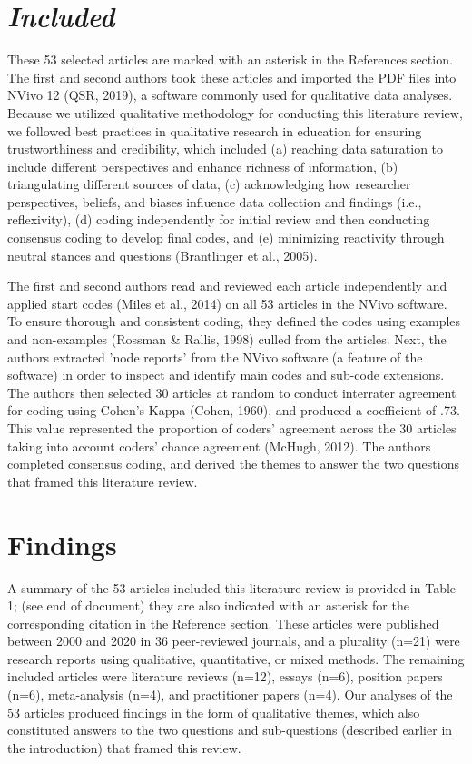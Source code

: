 \documentclass[11pt]{sig-alternate}
\begin{document}
\begin{large}
\section*{\textit{Included}}

These 53 selected articles are marked with an asterisk in the References section. The first and second authors took these articles and imported the PDF files into NVivo 12 (QSR, 2019), a software commonly used for qualitative data analyses. Because we utilized qualitative methodology for conducting this literature review, we followed best practices in qualitative research in education for ensuring trustworthiness and credibility, which included (a) reaching data saturation to include different perspectives and enhance richness of information, (b) triangulating different sources of data, (c) acknowledging how researcher perspectives, beliefs, and biases influence data collection and findings (i.e., reflexivity), (d) coding independently for initial review and then conducting consensus coding to develop final codes, and (e) minimizing reactivity through neutral stances and questions (Brantlinger et al., 2005).  

The first and second authors read and reviewed each article independently and applied start codes (Miles et al., 2014) on all 53 articles in the NVivo software. To ensure thorough and consistent coding, they defined the codes using examples and non-examples (Rossman \& Rallis, 1998) culled from the articles. Next, the authors extracted 'node reports’ from the NVivo software (a feature of the software) in order to inspect and identify main codes and sub-code extensions. The authors then selected 30 articles at random to conduct interrater agreement for coding using Cohen’s Kappa (Cohen, 1960), and produced a coefficient of .73. This value represented the proportion of coders’ agreement across the 30 articles taking into account coders’ chance agreement (McHugh, 2012). The authors completed consensus coding, and derived the themes to answer the two questions that framed this literature review.

\section*{Findings}

A summary of the 53 articles included this literature review is provided in Table 1; (see end of document) they are also indicated with an asterisk for the corresponding citation in the Reference section. These articles were published between 2000 and 2020 in 36 peer-reviewed journals, and a plurality (n=21) were research reports using qualitative, quantitative, or mixed methods. The remaining included articles were literature reviews (n=12), essays (n=6), position papers (n=6), meta-analysis (n=4), and practitioner papers (n=4). Our analyses of the 53 articles produced findings in the form of qualitative themes, which also constituted answers to the two questions and sub-questions (described earlier in the introduction) that framed this review. 


\end{large}
\end{document}
